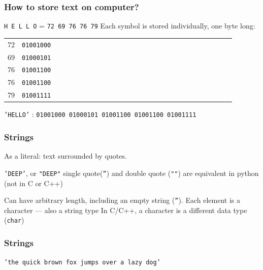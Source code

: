\documentclass[11pt]{beamer}
\begin{document}
\begin{frame}
  \frametitle{How to store text on computer?}
  \Enlarge

  \begin{itemize}
  \myitem \texttt{H E L L O} = \texttt{72 69 76 76 79} \pause
  \myitem  Each symbol is stored individually, one byte long: \\
   \vspace{2mm} \pause
    \begin{tabular}{*{27}{l}}
      72 & \texttt{01001000} \\
      69 & \texttt{01000101} \\
      76 & \texttt{01001100} \\
      76 & \texttt{01001100} \\
      79 & \texttt{01001111} \\
    \end{tabular} \pause
    
    \vspace{2mm}
    {\small \texttt{'HELLO'} : \textcolor{CS101GradBot}{\texttt{01001000 01000101 01001100 01001100 01001111}}}
  \end{itemize}
\end{frame}


\begin{frame}
  \frametitle{Strings}
  \Enlarge

  \begin{itemize} \pause
  \myitem  As a literal:  text surrounded by quotes.
    \begin{itemize}
    \mysubitem  \texttt{'DEEP'}, or \texttt{"DEEP"} \pause
    \mysubitem single quote(\texttt{''}) and double quote (\texttt{""}) are equivalent in python (not in C or C++)
    \end{itemize}\pause
  \myitem  Can have arbitrary length, including an empty string (\texttt{''}). \pause
  \myitem  Each element is a character --- also a string type \pause
  \myitem  In C/C++, a character is a different data type (\texttt{char})
  \end{itemize}
\end{frame}

\begin{frame}
  \frametitle{Strings}
  \Enlarge

  \begin{center}
  \texttt{'the quick brown fox jumps over a lazy dog'}
  \end{center}
 \end{frame}
\end{document}
